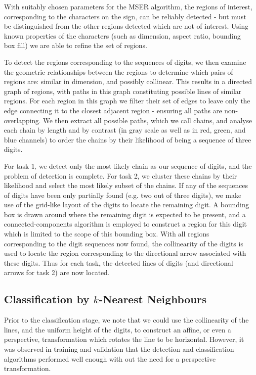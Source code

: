 \documentclass{article}
\begin{document}
With suitably chosen parameters for the MSER algorithm, the regions of interest,
corresponding to the characters on the sign, can be reliably detected - but must
be distinguished from the other regions detected which are not of interest.
Using known properties of the characters (such as dimension, aspect ratio,
bounding box fill) we are able to refine the set of regions.

To detect the regions corresponding to the sequences of digits, we then examine
the geometric relationships between the regions to determine which pairs of
regions are: similar in dimension, and possibly collinear.
This results in a directed graph of regions, with paths in this graph
constituting possible lines of similar regions.
For each region in this graph we filter their set of edges to leave only the
edge connecting it to the closest adjacent region - ensuring all paths are
non-overlapping.
We then extract all possible paths, which we call chains, and analyse each chain
by length and by contrast (in gray scale as well as in red, green, and blue
channels) to order the chains by their likelihood of being a sequence of three
digits.

For task 1, we detect only the most likely chain as our sequence of digits, and
the problem of detection is complete.
For task 2, we cluster these chains by their likelihood and select the most
likely subset of the chains.
If any of the sequences of digits have been only partially found (e.g. two out
of three digits), we make use of the grid-like layout of the digits to locate
the remaining digit.
A bounding box is drawn around where the remaining digit is expected to be
present, and a connected-components algorithm is employed to construct a region
for this digit which is limited to the scope of this bounding box.
With all regions corresponding to the digit sequences now found, the
collinearity of the digits is used to locate the region corresponding to the
directional arrow associated with these digits.
Thus for each task, the detected lines of digits (and directional arrows for
task 2) are now located.

\subsection{Classification by $k$-Nearest Neighbours}
\label{sec:imp-classification}

Prior to the classification stage, we note that we could use the collinearity of
the lines, and the uniform height of the digits, to construct an affine, or even
a perspective, transformation which rotates the line to be horizontal.
However, it was observed in training and validation that the detection and
classification algorithms performed well enough with out the need for a
perspective transformation.
\end{document}
